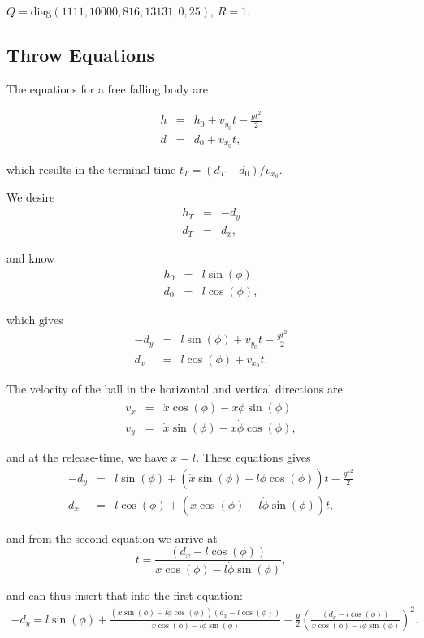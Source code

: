$Q=\text{diag}(1111,10000,816,13131,0,25)$, $R=1.$


\subsection{Throw Equations}

The equations for a free falling body are

\begin{eqnarray*}
h & = & h_{0}+v_{y_{0}}t-\frac{gt^{2}}{2}\\
d & = & d_{0}+v_{x_{0}}t,
\end{eqnarray*}


which results in the terminal time $t_{T}=(d_{T}-d_{0})/v_{x_{0}}$.

We desire 
\begin{eqnarray*}
h_{T} & = & -d_{y}\\
d_{T} & = & d_{x},
\end{eqnarray*}


and know
\begin{eqnarray*}
h_{0} & = & l\sin(\phi)\\
d_{0} & = & l\cos(\phi),
\end{eqnarray*}


which gives
\begin{eqnarray*}
-d_{y} & = & l\sin(\phi)+v_{y_{0}}t-\frac{gt^{2}}{2}\\
d_{x} & = & l\cos(\phi)+v_{x_{0}}t.
\end{eqnarray*}


The velocity of the ball in the horizontal and vertical directions
are
\begin{eqnarray*}
v_{x} & = & \dot{x}\cos(\phi)-x\dot{\phi}\sin(\phi)\\
v_{y} & = & \dot{x}\sin(\phi)-x\dot{\phi}\cos(\phi),
\end{eqnarray*}


and at the release-time, we have $x=l$. These equations gives
\begin{eqnarray*}
-d_{y} & = & l\sin(\phi)+\left(\dot{x}\sin(\phi)-l\dot{\phi}\cos(\phi)\right)t-\frac{gt^{2}}{2}\\
d_{x} & = & l\cos(\phi)+\left(\dot{x}\cos(\phi)-l\dot{\phi}\sin(\phi)\right)t,
\end{eqnarray*}


and from the second equation we arrive at 
\[
t=\frac{\left(d_{x}-l\cos(\phi)\right)}{\dot{x}\cos(\phi)-l\dot{\phi}\sin(\phi)},
\]


and can thus insert that into the first equation:
\begin{gather*}
-d_{y}=l\sin(\phi)+\frac{\left(\dot{x}\sin(\phi)-l\dot{\phi}\cos(\phi)\right)\left(d_{x}-l\cos(\phi)\right)}{\dot{x}\cos(\phi)-l\dot{\phi}\sin(\phi)}-\frac{g}{2}\left(\frac{\left(d_{x}-l\cos(\phi)\right)}{\dot{x}\cos(\phi)-l\dot{\phi}\sin(\phi)}\right)^{2}.
\end{gather*}



